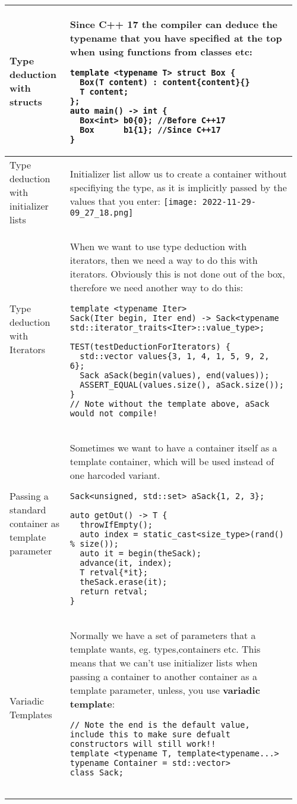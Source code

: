 \documentclass[main.tex,fontsize=8pt,paper=a4,paper=portrait,DIV=calc,]{scrartcl}
\begin{document}
\begin{table}[ht!]
\begin{tabular}{|m{0.2\linewidth}|m{0.755\linewidth}|}
\hline
Type deduction with structs & 
Since C++ 17 the compiler can deduce the typename that you have specified at the top when using functions from classes etc: \newline
\begin{lstlisting}
template <typename T> struct Box {
  Box(T content) : content{content}{}
  T content;
};
auto main() -> int {
  Box<int> b0{0}; //Before C++17
  Box      b1{1}; //Since C++17
}
\end{lstlisting} \\
\hline
Type deduction with initializer lists & 
Initializer list allow us to create a container without specifiying the type, as it is implicitly passed by the values that you enter:\newline
\texttt{[image: 2022-11-29-09\_27\_18.png]}\\
\hline
Type deduction with Iterators & 
When we want to use type deduction with iterators, then we need a way to do this with iterators.\newline
Obviously this is not done out of the box, therefore we need another way to do this: \newline
\begin{lstlisting}
template <typename Iter>
Sack(Iter begin, Iter end) -> Sack<typename std::iterator_traits<Iter>::value_type>;

TEST(testDeductionForIterators) {
  std::vector values{3, 1, 4, 1, 5, 9, 2, 6};
  Sack aSack(begin(values), end(values));
  ASSERT_EQUAL(values.size(), aSack.size());
}
// Note without the template above, aSack would not compile!
\end{lstlisting}\\
\hline
Passing a standard container as template parameter & 
Sometimes we want to have a container itself as a template container, which will be used instead of one harcoded variant.\newline
\begin{lstlisting}
Sack<unsigned, std::set> aSack{1, 2, 3};

auto getOut() -> T {
  throwIfEmpty();
  auto index = static_cast<size_type>(rand() % size());
  auto it = begin(theSack);
  advance(it, index);
  T retval{*it};
  theSack.erase(it);
  return retval;
}
\end{lstlisting}\\
\hline
Variadic Templates & 
Normally we have a set of parameters that a template wants, eg. types,containers etc. This means that we can't use initializer lists when passing a container to another container as a template parameter, unless, you use \textbf{variadic template}:\newline
\begin{lstlisting}
// Note the end is the default value, include this to make sure defualt constructors will still work!!
template <typename T, template<typename...> typename Container = std::vector>
class Sack;


\end{lstlisting}
\end{tabular}
\end{table}
\end{document}
